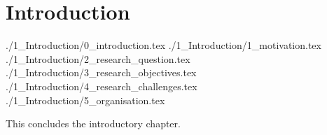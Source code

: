 \chapter{Introduction}
{./1_Introduction/0_introduction.tex}
{./1_Introduction/1_motivation.tex}
{./1_Introduction/2_research_question.tex}
{./1_Introduction/3_research_objectives.tex}
{./1_Introduction/4_research_challenges.tex}
{./1_Introduction/5_organisation.tex}

This concludes the introductory chapter.